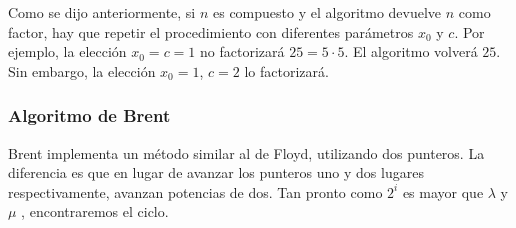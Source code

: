Como se dijo anteriormente, si $n$ es compuesto y el algoritmo devuelve $n$ como factor, hay que repetir el procedimiento con diferentes parámetros $x_0$ y $c$. Por ejemplo, la elección $x_0 = c = 1$ no factorizará $25 = 5 \cdot 5$. El algoritmo volverá $25$. Sin embargo, la elección $x_0 = 1$, $c = 2$ lo factorizará.


\subsubsection{Algoritmo de Brent}

Brent implementa un método similar al de Floyd, utilizando dos punteros. La diferencia es que en lugar de avanzar los punteros uno y dos lugares respectivamente, avanzan potencias de dos. Tan pronto como $2^i$ es mayor que $\lambda$ y $\mu$ , encontraremos el ciclo.